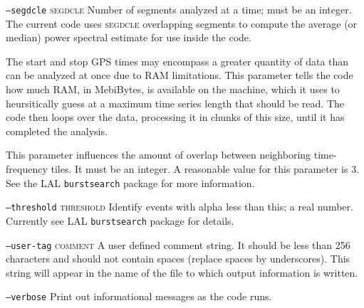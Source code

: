 \begin{entry}
\begin{entry}
\item[\option{--psd-average-points} \parm{samples}]
\item[\texttt{--segdcle} \textsc{segdcle}] Number of segments analyzed at a
time;  must be an integer.  The current code uses \textsc{segdcle}
overlapping segments to compute the average (or median) power spectral
estimate for use inside the code.

\item[\option{--ram-limit} \parm{MebiBytes}]
The start and stop GPS times may encompass a greater quantity of data than
can be analyzed at once due to RAM limitations.  This parameter tells the
code how much RAM, in MebiBytes, is available on the machine, which it uses
to heursitically guess at a maximum time series length that should be read.
The code then loops over the data, processing it in chunks of this size,
until it has completed the analysis.

\item[\option{--resample-filter} \parm{filter type}]

\item[\option{--seed} \parm{seed}]

\item[\option{--target-sample-rate} \parm{Hz}]

\item[\option{--tile-overlap-factor} \parm{factor}]
This parameter influences the amount of overlap between neighboring
time-frequency tiles.  It must be an integer.  A reasonable value for this
parameter is 3.  See the LAL \texttt{burstsearch} package for more
information.

\item[\option{--threshold} \parm{threshold}]
\item[\texttt{--threshold} \textsc{threshold}] Identify events with alpha
less than this; a real number.  Currently see LAL \texttt{burstsearch}
package for details.

\item[\option{--user-tag} \parm{comment}]
\item[\texttt{--user-tag} \textsc{comment}] A user defined comment string.
It should be less than 256 characters and should not contain spaces
(replace spaces by underscores).  This string will appear in the name of
the file to which output information is written.

\item[\option{--verbose}]
\item[\texttt{--verbose}] Print out informational messages as the code
runs.


\end{entry}
\end{entry}
